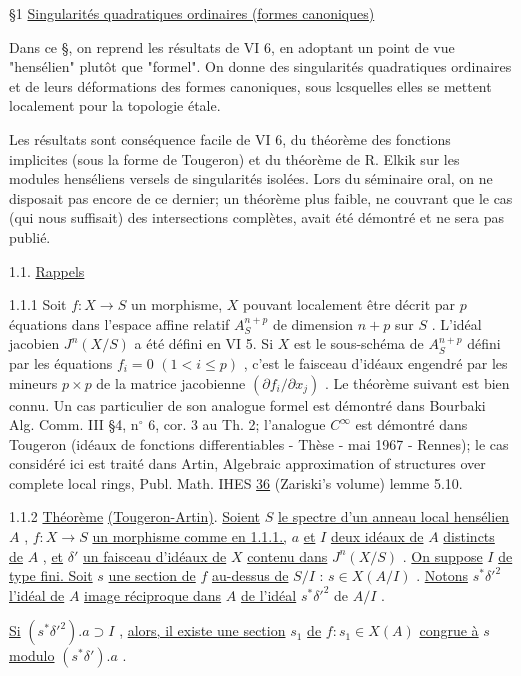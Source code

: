 \S1  \underline{Singularités quadratiques ordinaires (formes canoniques)}

Dans ce \S, on reprend les résultats de VI 6, en adoptant un point de vue "hensélien" plutôt que "formel". On donne des singularités quadratiques ordinaires et de leurs déformations des formes canoniques, sous lcsquelles elles se mettent localement pour la topologie étale.

Les résultats sont conséquence facile de VI 6, du théorème des fonctions implicites (sous la forme de Tougeron) et du théorème de R. Elkik sur les modules henséliens versels de singularités isolées. Lors du séminaire oral, on ne disposait pas encore de ce dernier; un théorème plus faible, ne couvrant que le cas (qui nous suffisait) des intersections complètes, avait été démontré et ne sera pas publié.


1.1.  \underline{Rappels}

1.1.1  Soit $f : X \to S$ un morphisme, $X$ pouvant localement être décrit par $p$ équations dans l'espace affine relatif $A_S^{n+p}$ de dimension $n+p$ sur $S$ . L'idéal jacobien $J^n(X/S)$ a été défini en VI 5. Si $X$ est le sous-schéma de $A_S^{n+p}$ défini par les équations $f_i = 0$ $(1 < i \leq p)$ , c'est le faisceau d'idéaux engendré par les mineurs $p \times p$ de la matrice jacobienne $(\partial f_i/\partial x_j)$ . Le théorème suivant est bien connu. Un cas particulier de son analogue formel est démontré dans Bourbaki Alg. Comm. III \S4, n$^{\circ}$ 6, cor. 3 au Th. 2; l'analogue $C^{\infty}$ est démontré dans Tougeron (idéaux de fonctions differentiables - Thèse - mai 1967 - Rennes); le cas considéré ici est traité dans Artin, Algebraic approximation of structures over complete local rings, Publ. Math. IHES \underline{36} (Zariski's volume) lemme 5.10.

1.1.2  \underline{Théorème} \underline{(Tougeron-Artin)}. \underline{Soient} $S$ \underline{le spectre d'un anneau local hensélien} $A$ , $f : X \to S$ \underline{un morphisme comme en 1.1.1.,} $a$ \underline{et} $I$ \underline{deux idéaux de} $A$ \underline{distincts de} $A$ , \underline{et} $\delta'$ \underline{un faisceau d'idéaux de} $X$ \underline{contenu dans} $J^n(X/S)$ . \underline{On suppose} $I$ \underline{de type fini. Soit} $s$ \underline{une section de} $f$ \underline{au-dessus de} $S/I$ : $s \in X(A/I)$ . \underline{Notons} $s^{*}\delta'^{2}$ \underline{l'idéal de} $A$ \underline{image réciproque dans} $A$ \underline{de l'idéal} $s^{*}\delta'^{2}$ de $A/I$ .

\underline{Si} $(s^{*}\delta'^{2}).a \supset I$ , \underline{alors, il existe une section} $s_1$ \underline{de} $f : s_1 \in X(A)$
\underline{congrue à} $s$ \underline{modulo} $(s^{*}\delta').a$ .

